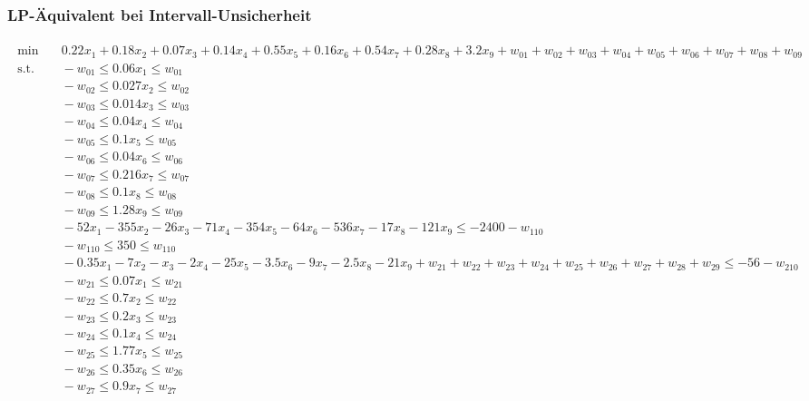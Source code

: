 \documentclass[a4paper,12pt]{article}
\begin{document}
\subsubsection*{LP-\"Aquivalent bei Intervall-Unsicherheit}
\label{sec:lp-equivalent-interval}
\begin{adjustwidth}{-1.5cm}{}
\begin{tiny}
\setlength{\jot}{0pt}
\[
\begin{aligned}
   \begin{aligned}
    \min & \quad  0.22x_1 + 0.18x_2 + 0.07x_3 + 0.14x_4 + 0.55x_5 + 0.16x_6 + 0.54x_7 + 0.28x_8 + 3.2x_9 + w_{01} + w_{02} + w_{03} + w_{04} + w_{05} + w_{06} + w_{07}+ w_{08}+ w_{09} \\
    \text{s.t.} & \quad -w_{01} \leq 0.06x_1 \leq w_{01} \\
    & \quad -w_{02} \leq 0.027x_2 \leq w_{02} \\
    & \quad -w_{03} \leq 0.014x_3 \leq w_{03} \\
    & \quad -w_{04} \leq 0.04x_4 \leq w_{04} \\
    & \quad -w_{05} \leq 0.1x_5 \leq w_{05} \\
    & \quad -w_{06} \leq 0.04x_6 \leq w_{06} \\
    & \quad -w_{07} \leq 0.216x_7 \leq w_{07} \\
    & \quad -w_{08} \leq 0.1x_8 \leq w_{08} \\
    & \quad -w_{09} \leq 1.28x_9 \leq w_{09} \\
    & \quad -52x_1-355x_2-26x_3-71x_4-354x_5-64x_6-536x_7-17x_8-121x_9 \leq -2400 - w_{110}\\
    & \quad -w_{110} \leq 350 \leq w_{110} \\
    & \quad -0.35x_1 - 7x_2 - x_3 - 2x_4 - 25x_5 - 3.5x_6 - 9x_7 - 2.5x_8 - 21x_9 + w_{21} + w_{22} + w_{23} + w_{24} + w_{25} + w_{26} + w_{27}+ w_{28}+ w_{29} \leq -56 - w_{210} \\
    & \quad -w_{21} \leq 0.07x_1 \leq w_{21} \\
    & \quad -w_{22} \leq 0.7x_2 \leq w_{22} \\
    & \quad -w_{23} \leq 0.2x_3 \leq w_{23} \\
    & \quad -w_{24} \leq 0.1x_4 \leq w_{24} \\
    & \quad -w_{25} \leq 1.77x_5 \leq w_{25} \\
    & \quad -w_{26} \leq 0.35x_6 \leq w_{26} \\
    & \quad -w_{27} \leq 0.9x_7 \leq w_{27} \\

\end{aligned}
\end{aligned}\]
\end{tiny}
\end{adjustwidth}
\end{document}
